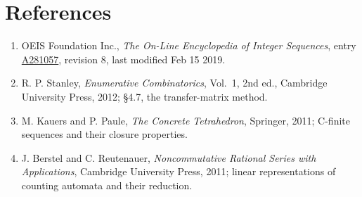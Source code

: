 \documentclass[11pt]{article}
\theoremstyle{definition}
\begin{document}
\section{References}

\begin{enumerate}

\item OEIS Foundation Inc., \emph{The On-Line Encyclopedia of Integer Sequences}, entry \href{https://oeis.org/A281057}{A281057}, revision 8, last modified Feb 15 2019.

\item R. P. Stanley, \emph{Enumerative Combinatorics}, Vol.~1, 2nd ed., Cambridge University Press, 2012; \S4.7, the transfer-matrix method.

\item M. Kauers and P. Paule, \emph{The Concrete Tetrahedron}, Springer, 2011; C-finite sequences and their closure properties.

\item J. Berstel and C. Reutenauer, \emph{Noncommutative Rational Series with Applications}, Cambridge University Press, 2011; linear representations of counting automata and their reduction.

\end{enumerate}
\end{document}
